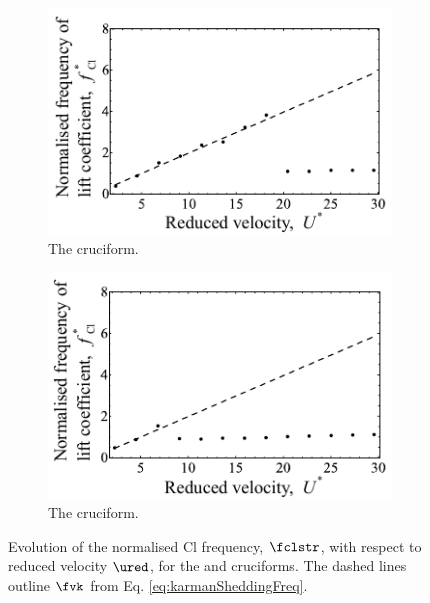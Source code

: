 \documentclass[a4paper,fleqn]{cas-sc}
\begin{document}
\begin{figure}
  \centering
  \begin{subfigure}[h]{0.4\textwidth}
    \includegraphics[width=\textwidth]{figs/clFreq2}
    \caption{The \angtw{} cruciform.}
    \label{fig:clFreq2}
  \end{subfigure}
  \hspace{6mm}
  \begin{subfigure}[h]{0.4\textwidth}
    \includegraphics[width=\textwidth]{figs/clFreq1}
    \caption{The \angon{} cruciform.}
    \label{fig:clFreq1}
  \end{subfigure}

  \label{fig:clFreq21}
  \caption{Evolution of the normalised Cl frequency, $\fclstr$, with respect to reduced velocity $\ured$, for the \angtw{} and \angon{} cruciforms. The dashed lines outline $\fvk$ from Eq. \ref{eq:karmanSheddingFreq}.}
\end{figure}
\end{document}
